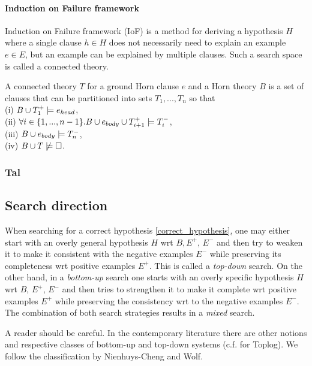 \paragraph{Induction on Failure framework\cite{kimber2012learning}}
Induction on Failure framework (IoF) is a method for deriving a hypothesis $H$ where a single clause $h \in H$ does not necessarily need to explain an example $e \in E$, but an example can be explained by multiple clauses. Such a search space is called a connected theory.
\begin{defn}
A connected theory $T$ for a ground Horn clause $e$ and a Horn theory $B$ is a set of clauses that can be partitioned into sets $T_1, ..., T_n$ so that\\
(i) $B \cup T_1^+ \models e_{head}$,\\
(ii) $\forall i \in \{1, ..., n-1\}. B \cup e_{body} \cup T_{i+1}^+ \models T_i^-$,\\
(iii) $B \cup e_{body} \models T_n^-$,\\
(iv) $B \cup T \not\models \square$.
\end{defn}

\subsubsection{Tal}

\subsection{Search direction\cite{nienhuys1997foundations}}
When searching for a correct hypothesis \ref{correct_hypothesis}, one may either start with an overly general hypothesis $H$ wrt $B, E^+$, $E^-$ and then try to weaken it to make it consistent with the negative examples $E^-$ while preserving its completeness wrt positive examples $E^+$. This is called a \emph{top-down} search.
On the other hand, in a \emph{bottom-up} search one starts with an overly specific hypothesis $H$ wrt $B$, $E^+$, $E^-$ and then tries to strengthen it to make it complete wrt positive examples $E^+$ while preserving the consistency wrt to the negative examples $E^-$.
The combination of both search strategies results in a \emph{mixed} search.

\begin{remark}
A reader should be careful. In the contemporary literature there are other notions and respective classes of bottom-up and top-down systems (c.f.\cite{corapi2010inductive} for Toplog). We follow the classification by Nienhuys-Cheng and Wolf\cite{nienhuys1997foundations}.
\end{remark}

